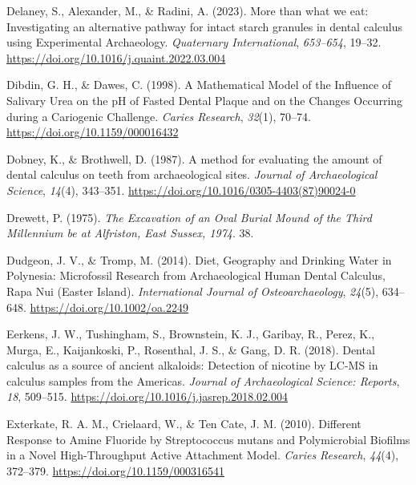 \documentclass[
  letterpaper,
]{book}
\newlength{\cslhangindent}
\newlength{\cslentryspacingunit} %
\newenvironment{CSLReferences}[2] %
 {%
  \setlength{\parindent}{0pt}
  \ifodd #1
  \let\oldpar\par
  \def\par{\hangindent=\cslhangindent\oldpar}
  \fi
  \setlength{\parskip}{#2\cslentryspacingunit}
 }%
 {}
\begin{document}
\begin{CSLReferences}{1}{0}
\leavevmode{}%
Delaney, S., Alexander, M., \& Radini, A. (2023). More than what we eat:
{Investigating} an alternative pathway for intact starch granules in
dental calculus using {Experimental Archaeology}. \emph{Quaternary
International}, \emph{653--654}, 19--32.
\url{https://doi.org/10.1016/j.quaint.2022.03.004}

\leavevmode{}%
Dibdin, G. H., \& Dawes, C. (1998). A {Mathematical Model} of the
{Influence} of {Salivary Urea} on the {pH} of {Fasted Dental Plaque} and
on the {Changes Occurring} during a {Cariogenic Challenge}. \emph{Caries
Research}, \emph{32}(1), 70--74. \url{https://doi.org/10.1159/000016432}

\leavevmode{}%
Dobney, K., \& Brothwell, D. (1987). A method for evaluating the amount
of dental calculus on teeth from archaeological sites. \emph{Journal of
Archaeological Science}, \emph{14}(4), 343--351.
\url{https://doi.org/10.1016/0305-4403(87)90024-0}

\leavevmode{}%
Drewett, P. (1975). \emph{The {Excavation} of an {Oval Burial Mound} of
the {Third Millennium} be at {Alfriston}, {East Sussex}, 1974}. 38.

\leavevmode{}%
Dudgeon, J. V., \& Tromp, M. (2014). Diet, {Geography} and {Drinking
Water} in {Polynesia}: {Microfossil Research} from {Archaeological Human
Dental Calculus}, {Rapa Nui} ({Easter Island}). \emph{International
Journal of Osteoarchaeology}, \emph{24}(5), 634--648.
\url{https://doi.org/10.1002/oa.2249}

\leavevmode{}%
Eerkens, J. W., Tushingham, S., Brownstein, K. J., Garibay, R., Perez,
K., Murga, E., Kaijankoski, P., Rosenthal, J. S., \& Gang, D. R. (2018).
Dental calculus as a source of ancient alkaloids: {Detection} of
nicotine by {LC-MS} in calculus samples from the {Americas}.
\emph{Journal of Archaeological Science: Reports}, \emph{18}, 509--515.
\url{https://doi.org/10.1016/j.jasrep.2018.02.004}

\leavevmode{}%
Exterkate, R. A. M., Crielaard, W., \& Ten Cate, J. M. (2010). Different
{Response} to {Amine Fluoride} by {Streptococcus} mutans and
{Polymicrobial Biofilms} in a {Novel High-Throughput Active Attachment
Model}. \emph{Caries Research}, \emph{44}(4), 372--379.
\url{https://doi.org/10.1159/000316541}


\end{CSLReferences}
\end{document}
